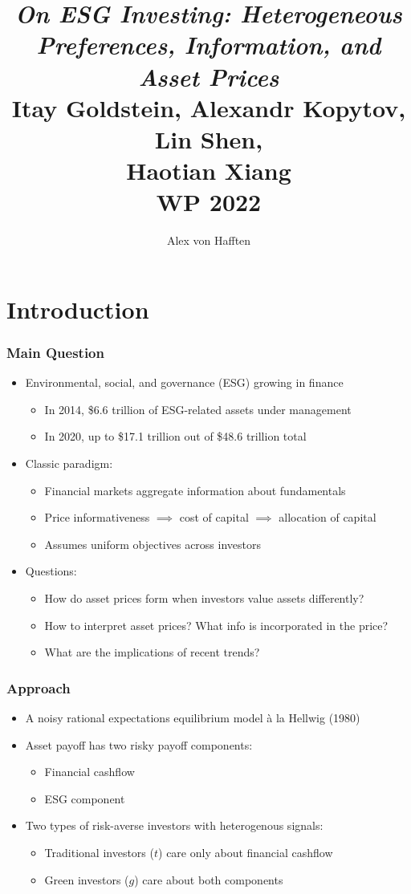 \documentclass{beamer}
\title[Goldstein et al. ``On ESG Investing"]{\textit{On ESG Investing: Heterogeneous Preferences, Information, and Asset Prices} \\ Itay Goldstein, Alexandr Kopytov, Lin Shen, \\Haotian Xiang \\WP 2022}
\author{Alex von Hafften}
\institute{UW-Madison}
\begin{document}
\section{Introduction}

\begin{frame}
\titlepage
\end{frame}

\begin{frame}
\frametitle{Main Question}
\begin{itemize}[<+->]
\item Environmental, social, and governance (ESG) growing in finance
\begin{itemize}[<+->]
\item In 2014, \$6.6 trillion of ESG-related assets under management
\item In 2020, up to \$17.1 trillion out of \$48.6 trillion total
\end{itemize}
\bigskip
\item Classic paradigm:
\begin{itemize}[<+->]
\item Financial markets aggregate information about fundamentals
\item Price informativeness $\implies$ cost of capital $\implies$ allocation of capital
\item Assumes uniform objectives across investors
\end{itemize}
\bigskip
\item Questions:
\begin{itemize}[<+->]
\item How do asset prices form when investors value assets differently?
\item How to interpret asset prices? What info is incorporated in the price?
\item What are the implications of recent trends?
\end{itemize}
\end{itemize}
\end{frame}


\begin{frame}
\frametitle{Approach}
\begin{itemize}[<+->]
\item A noisy rational expectations equilibrium model \`a la Hellwig (1980)
\bigskip
\item Asset payoff has two risky payoff components:
\begin{itemize}[<+->]
\item Financial cashflow 
\item ESG component
\end{itemize}
\bigskip
\item Two types of risk-averse investors with heterogenous signals:
\begin{itemize}[<+->]
\item Traditional investors ($t$) care only about financial cashflow
\item Green investors ($g$) care about both components
\end{itemize}
\end{itemize}
\end{frame}
\end{document}

